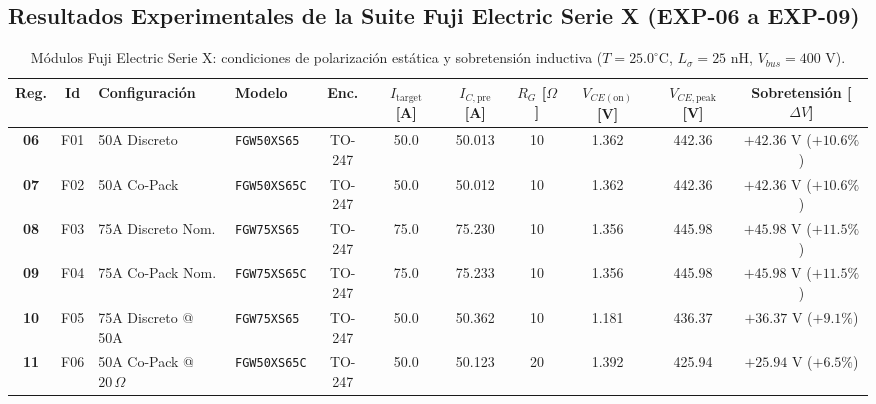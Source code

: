 \documentclass[11pt,a4paper]{article}
\begin{document}
\begin{landscape}
\newpage

\subsection{Resultados Experimentales de la Suite Fuji Electric Serie X (EXP-06 a EXP-09)}

\begin{table}[htbp]
\centering
\small
\setlength{\tabcolsep}{6.0pt}
\caption{Módulos Fuji Electric Serie X: condiciones de polarización estática y sobretensión inductiva ($T = 25.0^\circ\text{C}$, $L_\sigma = 25\text{ nH}$, $V_{bus} = 400\text{ V}$).}
\label{tab:fuji_estatica}
\begin{tabular}{@{}c c l l c c c c c c c@{}}
\toprule
\textbf{Reg.} & \textbf{Id} & \textbf{Configuración} & \textbf{Modelo} & \textbf{Enc.} & $I_{\text{target}}$ [A] & $I_{C,\text{pre}}$ [A] & $R_G$ [$\Omega$] & $V_{CE(\text{on})}$ [V] & $V_{CE,\text{peak}}$ [V] & \textbf{Sobretensión} [$\Delta V$] \\
\midrule
\textbf{06} & F01 & 50A Discreto & \texttt{FGW50XS65}  & TO-247 & 50.0 & 50.013 & 10 & 1.362 & 442.36 & $+42.36\text{ V}$ ($+10.6\%$) \\
\textbf{07} & F02 & 50A Co-Pack  & \texttt{FGW50XS65C} & TO-247 & 50.0 & 50.012 & 10 & 1.362 & 442.36 & $+42.36\text{ V}$ ($+10.6\%$) \\
\textbf{08} & F03 & 75A Discreto Nom. & \texttt{FGW75XS65}  & TO-247 & 75.0 & 75.230 & 10 & 1.356 & 445.98 & $+45.98\text{ V}$ ($+11.5\%$) \\
\textbf{09} & F04 & 75A Co-Pack Nom.  & \texttt{FGW75XS65C} & TO-247 & 75.0 & 75.233 & 10 & 1.356 & 445.98 & $+45.98\text{ V}$ ($+11.5\%$) \\
\textbf{10} & F05 & 75A Discreto @ 50A & \texttt{FGW75XS65}  & TO-247 & 50.0 & 50.362 & 10 & 1.181 & 436.37 & $+36.37\text{ V}$ ($+9.1\%$) \\
\textbf{11} & F06 & 50A Co-Pack @ $20\,\Omega$ & \texttt{FGW50XS65C} & TO-247 & 50.0 & 50.123 & 20 & 1.392 & 425.94 & $+25.94\text{ V}$ ($+6.5\%$) \\
\bottomrule
\end{tabular}
\end{table}

\vspace{0.35cm}


\end{landscape}
\end{document}
